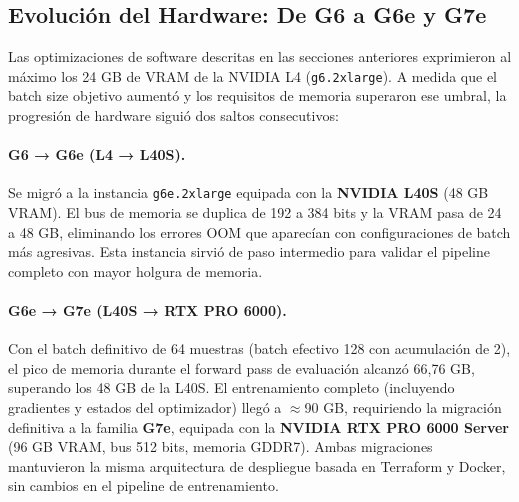 \subsection{Evolución del Hardware: De G6 a G6e y G7e}

Las optimizaciones de software descritas en las secciones anteriores exprimieron al máximo los 24 GB de VRAM de la NVIDIA L4 (\texttt{g6.2xlarge}). A medida que el batch size objetivo aumentó y los requisitos de memoria superaron ese umbral, la progresión de hardware siguió dos saltos consecutivos:

\paragraph{G6 → G6e (L4 → L40S).} Se migró a la instancia \texttt{g6e.2xlarge} equipada con la \textbf{NVIDIA L40S} (48 GB VRAM). El bus de memoria se duplica de 192 a 384 bits y la VRAM pasa de 24 a 48 GB, eliminando los errores OOM que aparecían con configuraciones de batch más agresivas. Esta instancia sirvió de paso intermedio para validar el pipeline completo con mayor holgura de memoria.

\paragraph{G6e → G7e (L40S → RTX PRO 6000).} Con el batch definitivo de 64 muestras (batch efectivo 128 con acumulación de 2), el pico de memoria durante el forward pass de evaluación alcanzó 66,76 GB, superando los 48 GB de la L40S. El entrenamiento completo (incluyendo gradientes y estados del optimizador) llegó a $\approx$90 GB, requiriendo la migración definitiva a la familia \textbf{G7e}, equipada con la \textbf{NVIDIA RTX PRO 6000 Server} (96 GB VRAM, bus 512 bits, memoria GDDR7). Ambas migraciones mantuvieron la misma arquitectura de despliegue basada en Terraform y Docker, sin cambios en el pipeline de entrenamiento.